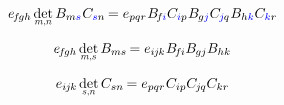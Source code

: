 \[
e_{\hspace{-0.25ex}f\hspace{-0.2ex}gh} \hspace{.33ex} \underset{\raisebox{.15em}{\scalebox{.7}{$m$,$n$}}}{\operatorname{det}} \, \somematrixelements{m\mathcolor{blue}{s}} \hspace{.1ex} C_{\mathcolor{blue}{s}n} \hspace{-0.2ex}
= e_{pqr} \hspace{.1ex} \somematrixelements{\hspace{-0.25ex}f\hspace{-0.1ex}\mathcolor{blue}{i}} C_{\mathcolor{blue}{i}p} \hspace{.1ex} \somematrixelements{\hspace{-0.1ex}g\mathcolor{blue}{j}} C_{\hspace{-0.1ex}\mathcolor{blue}{j}\hspace{-0.1ex}q} \hspace{.1ex} \somematrixelements{h\mathcolor{blue}{k}} C_{\mathcolor{blue}{k}r}
\hspace{-0.2ex}
\]

\[
e_{\hspace{-0.25ex}f\hspace{-0.2ex}gh} \hspace{.33ex} \underset{\raisebox{.15em}{\scalebox{.7}{$m$,$s$}}}{\operatorname{det}} \, \somematrixelements{ms} \hspace{-0.2ex}
= e_{i\hspace{-0.1ex}j\hspace{-0.1ex}k} \hspace{.1ex} \somematrixelements{\hspace{-0.25ex}f\hspace{-0.1ex}i} \somematrixelements{\hspace{-0.1ex}gj} \somematrixelements{hk}
\hspace{-0.2ex}
\]

\[
e_{i\hspace{-0.1ex}j\hspace{-0.1ex}k} \hspace{.33ex} \underset{\raisebox{.15em}{\scalebox{.7}{$s$,$n$}}}{\operatorname{det}} \, C_{sn} \hspace{-0.2ex}
= e_{pqr} \hspace{.1ex} C_{ip} C_{\hspace{-0.1ex}j\hspace{-0.1ex}q} C_{kr}
\hspace{-0.2ex}
\]

